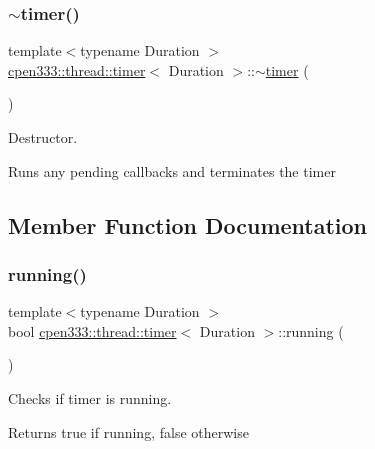 \subsubsection{\texorpdfstring{$\sim$timer()}{~timer()}}
{\footnotesize\ttfamily template$<$typename Duration $>$ \\
\hyperlink{classcpen333_1_1thread_1_1timer}{cpen333\+::thread\+::timer}$<$ Duration $>$\+::$\sim$\hyperlink{classcpen333_1_1thread_1_1timer}{timer} (\begin{DoxyParamCaption}{ }\end{DoxyParamCaption})\hspace{0.3cm}{\ttfamily [inline]}}



Destructor. 

Runs any pending callbacks and terminates the timer 

\subsection{Member Function Documentation}
\mbox{\label{classcpen333_1_1thread_1_1timer_a339ef2ea452a86d83a0f41c7d4e255b0}} 
\subsubsection{\texorpdfstring{running()}{running()}}
{\footnotesize\ttfamily template$<$typename Duration $>$ \\
bool \hyperlink{classcpen333_1_1thread_1_1timer}{cpen333\+::thread\+::timer}$<$ Duration $>$\+::running (\begin{DoxyParamCaption}{ }\end{DoxyParamCaption})\hspace{0.3cm}{\ttfamily [inline]}}



Checks if timer is running. 

\begin{DoxyReturn}{Returns}
true if running, false otherwise 
\end{DoxyReturn}
\mbox{\label{classcpen333_1_1thread_1_1timer_a0d1be90402f46912966ec5fc13707bce}} 
